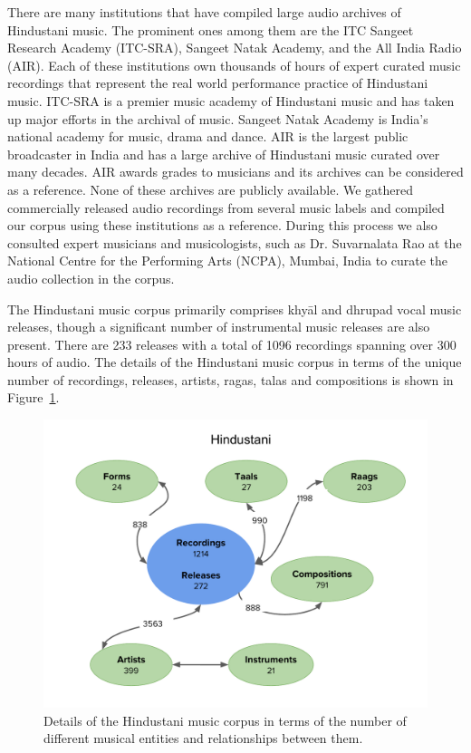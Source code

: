 There are many institutions that have compiled large audio archives of Hindustani music. The prominent ones among them are the ITC Sangeet Research Academy (ITC-SRA), Sangeet Natak Academy, and the All India Radio (AIR). Each of these institutions own thousands of hours of expert curated music recordings that represent the real world performance practice of Hindustani music. ITC-SRA is a premier music academy of Hindustani music and has taken up major efforts in the archival of music. Sangeet Natak Academy is India’s national academy for music, drama and dance. AIR is the largest public broadcaster in India and has a large archive of Hindustani music curated over many decades. AIR awards grades to musicians and its archives can be considered as a reference. None of these archives are publicly available. We gathered commercially released audio recordings from several music labels and compiled our corpus using these institutions as a reference. During this process we also consulted expert musicians and musicologists, such as Dr. Suvarnalata Rao at the National Centre for the Performing Arts (NCPA), Mumbai, India to curate the audio collection in the corpus. 

The Hindustani music corpus primarily comprises khy\={a}l and dhrupad vocal music releases, though a significant number of instrumental music releases are also present. There are 233 releases with a total of 1096 recordings spanning over 300 hours of audio. The details of the Hindustani music corpus in terms of the unique number of recordings, releases, artists, \glspl{raga}, \glspl{tala} and compositions is shown in Figure~\ref{fig:hindustani_corpus_details}.


\begin{figure}
	\begin{center}
		\includegraphics[width=\figSizeHundred]{ch04_datasets/figures/hindustani_corpus.pdf}
	\end{center}
	\caption{Details of the Hindustani music corpus in terms of the number of different musical entities and relationships between them.}
	\label{fig:hindustani_corpus_details}
\end{figure}


